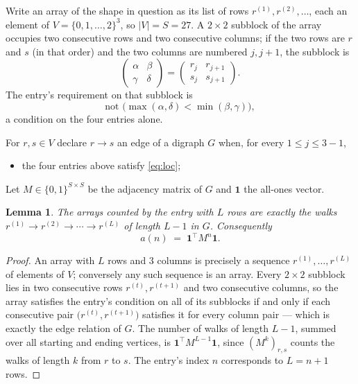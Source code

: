 \documentclass[11pt,a4paper]{article}
\theoremstyle{plain}
\newtheorem{lemma}[theorem]{Lemma}
\theoremstyle{definition}
\begin{document}
Write an array of the shape in question as its list of rows
$r^{(1)},r^{(2)},\dots$, each an element of
$V=\{0,1,\dots,2\}^{3}$, so $|V|=S=27$. A $2\times2$ subblock of the array
occupies two consecutive rows and two consecutive columns; if the two rows are $r$
and $s$ (in that order) and the two columns are numbered $j,j+1$,
the subblock is
\[
\begin{pmatrix}\alpha&\beta\\\gamma&\delta\end{pmatrix}=\begin{pmatrix}r_j&r_{j+1}\\s_j&s_{j+1}\end{pmatrix}.
\]
The entry's requirement on that subblock is
\begin{equation}\label{eq:loc}
\text{not }\bigl(\max(\alpha,\delta)<\min(\beta,\gamma)\bigr),
\end{equation}
a condition on the four entries alone.

For $r,s\in V$ declare $r\to s$ an edge of a digraph $G$ when, for every
$1\le j\le 3-1$,
\begin{itemize}
\item the four entries above satisfy \eqref{eq:loc};

\end{itemize}
Let $M\in\{0,1\}^{S\times S}$ be the adjacency matrix of $G$ and $\mathbf{1}$ the
all-ones vector.

\begin{lemma}\label{lem:walk}
The arrays counted by the entry with $L$ rows are exactly the walks
$r^{(1)}\to r^{(2)}\to\cdots\to r^{(L)}$ of length $L-1$ in $G$. Consequently
\[
a(n)\;=\;\mathbf{1}^{\!\top}M^{n}\mathbf{1} .
\]
\end{lemma}

\begin{proof}
An array with $L$ rows and $3$ columns is precisely a sequence
$r^{(1)},\dots,r^{(L)}$ of elements of $V$; conversely any such sequence is an array.
Every $2\times2$ subblock lies in two consecutive rows $r^{(t)},r^{(t+1)}$ and two
consecutive columns, so the array satisfies the entry's condition on all of its subblocks
if and only if each consecutive pair $\bigl(r^{(t)},r^{(t+1)}\bigr)$ satisfies it for
every column pair --- which is exactly the edge relation of $G$. The number of walks of
length $L-1$, summed over all starting and ending vertices, is
$\mathbf{1}^{\!\top}M^{L-1}\mathbf{1}$, since $(M^{k})_{r,s}$ counts the walks of
length $k$ from $r$ to $s$. The entry's index $n$ corresponds to $L=n+1$ rows.
\end{proof}
\end{document}
